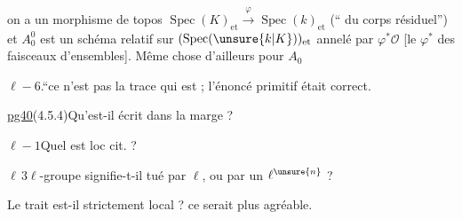  on a un morphisme de topos $\operatorname{Spec}(K)_{\mathrm{et}}\xrightarrow{\varphi}\operatorname{Spec}(k)_{\mathrm{et}}$ (`` du corps résiduel'') et $A_0^0$ est un schéma relatif sur $(\operatorname{Spec}(\unsure{k|K}))_{\mathrm{et}}$ annelé par $\varphi^*\mathcal O$ [le $\varphi^*$ des faisceaux d'ensembles]. Même chose d'ailleurs pour
$A_0$

$\ell-6$.\quad ``ce n'est pas la trace qui est ; l'énoncé primitif était correct.

\uline{pg40}\quad (4.5.4)\quad Qu'est-il écrit dans la marge ?

$\ell-1$\quad Quel est loc cit. ?

$\ell\,3$\quad $\ell$-groupe signifie-t-il tué par $\ell$, ou par un $\ell^{\unsure{n}}$ ?

Le trait est-il strictement local ? ce serait plus agréable.

